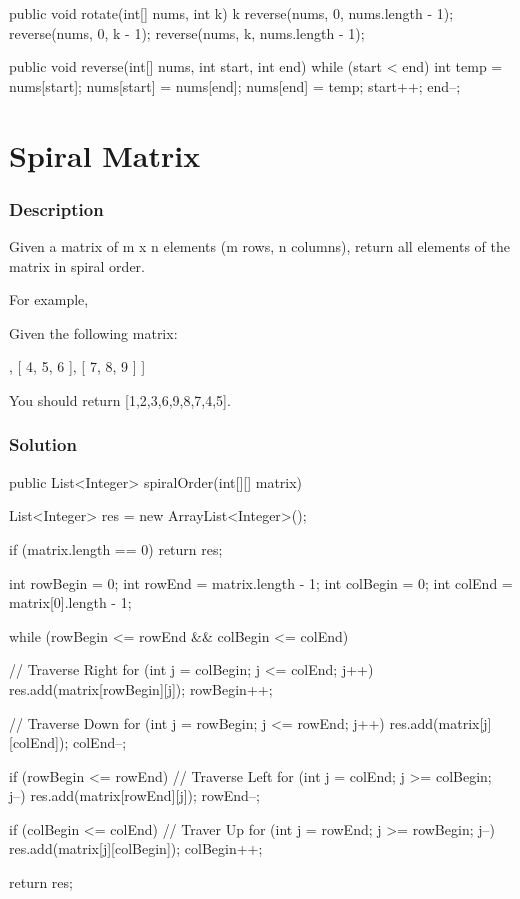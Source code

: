 \begin{Code}
public void rotate(int[] nums, int k) {
    k %
    reverse(nums, 0, nums.length - 1);
    reverse(nums, 0, k - 1);
    reverse(nums, k, nums.length - 1);
}

public void reverse(int[] nums, int start, int end) {
    while (start < end) {
        int temp = nums[start];
        nums[start] = nums[end];
        nums[end] = temp;
        start++;
        end--;
    }
}
\end{Code}

\newpage

\section{Spiral Matrix} %

\subsubsection{Description}
Given a matrix of m x n elements (m rows, n columns), return all elements of the matrix in spiral order.

For example,

Given the following matrix:
\begin{Code}
[
 [ 1, 2, 3 ],
 [ 4, 5, 6 ],
 [ 7, 8, 9 ]
]
\end{Code}

You should return [1,2,3,6,9,8,7,4,5].


\subsubsection{Solution}

\begin{Code}
public List<Integer> spiralOrder(int[][] matrix) {
    List<Integer> res = new ArrayList<Integer>();

    if (matrix.length == 0) {
        return res;
    }

    int rowBegin = 0;
    int rowEnd = matrix.length - 1;
    int colBegin = 0;
    int colEnd = matrix[0].length - 1;

    while (rowBegin <= rowEnd && colBegin <= colEnd) {
        // Traverse Right
        for (int j = colBegin; j <= colEnd; j++) {
            res.add(matrix[rowBegin][j]);
        }
        rowBegin++;

        // Traverse Down
        for (int j = rowBegin; j <= rowEnd; j++) {
            res.add(matrix[j][colEnd]);
        }
        colEnd--;

        if (rowBegin <= rowEnd) {
            // Traverse Left
            for (int j = colEnd; j >= colBegin; j--) {
                res.add(matrix[rowEnd][j]);
            }
        }
        rowEnd--;

        if (colBegin <= colEnd) {
            // Traver Up
            for (int j = rowEnd; j >= rowBegin; j--) {
                res.add(matrix[j][colBegin]);
            }
        }
        colBegin++;
    }

    return res;
}
\end{Code}

